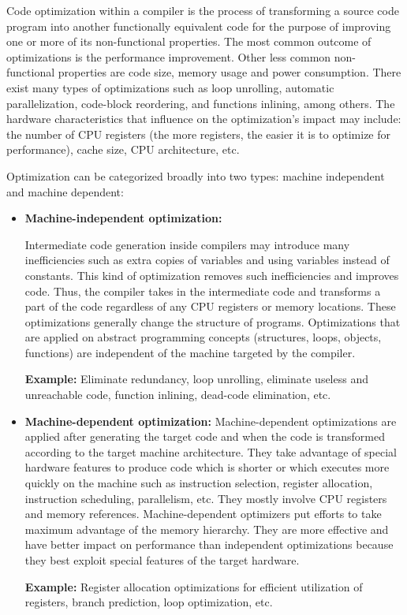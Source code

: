 Code optimization within a compiler is the process of transforming a source code program into another functionally equivalent code for the purpose of improving one or more of its non-functional properties. 
The most common outcome of optimizations is the performance improvement. Other less common non-functional properties are code size, memory usage and power consumption. 
There exist many types of optimizations such as loop unrolling, automatic parallelization, code-block reordering, and functions inlining, among others. The hardware characteristics that influence on the optimization's impact may include: the number of CPU registers (the more registers, the easier it is to optimize for performance), cache size, CPU architecture, etc.

Optimization can be categorized broadly into two types: machine independent and machine dependent: 
\begin{itemize}
	
	\item \textbf{Machine-independent optimization:}
	
	Intermediate code generation inside compilers may introduce many inefficiencies such as extra copies of variables and using variables instead of
	constants.
	This kind of optimization removes such inefficiencies and improves code. Thus, the compiler takes in the intermediate code and transforms a part of the code regardless of any CPU registers or memory locations. These optimizations generally change the structure of programs.
	Optimizations that are applied on abstract programming concepts (structures, loops, objects, functions) are independent of the machine targeted by the compiler.
	
	\textbf{Example:} Eliminate redundancy, loop unrolling, eliminate useless and unreachable code, function inlining, dead-code elimination, etc.
	
	\item \textbf{Machine-dependent optimization:} 
	Machine-dependent optimizations are applied after generating the target code and when the code is transformed according to the target machine architecture. They take advantage of special hardware features to produce code which is shorter or which executes more quickly on the machine such as instruction selection, register allocation, instruction scheduling, parallelism, etc.
	They mostly involve CPU registers and memory references. Machine-dependent optimizers put efforts to take maximum advantage of the memory hierarchy. They are more effective and have better impact on performance than independent optimizations because they best exploit special features of the target hardware.
	
	\textbf{Example:} Register allocation optimizations for efficient utilization of registers, branch prediction, loop optimization, etc.
 
 
\end{itemize}
 

